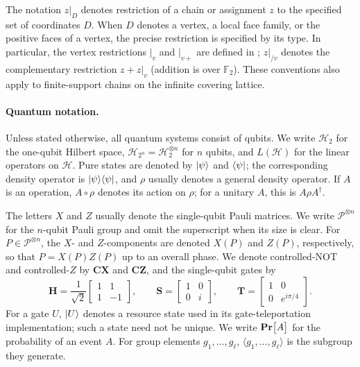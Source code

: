 The notation $z|_D$ denotes restriction of a chain or assignment $z$ to the specified set of coordinates $D$. When $D$ denotes a vertex, a local face family, or the positive faces of a vertex, the precise restriction is specified by its type. In particular, the vertex restrictions $|_v$ and $|_{v+}$ are defined in ; $z|_{/v}$ denotes the complementary restriction $z+z|_v$ (addition is over $\mathbb F_2$). These conventions also apply to finite-support chains on the infinite covering lattice.

\paragraph{Quantum notation.}
Unless stated otherwise, all quantum systems consist of qubits. We write $\mathcal H_2$ for the one-qubit Hilbert space, $\mathcal H_{2^n}=\mathcal H_2^{\otimes n}$ for $n$ qubits, and $L(\mathcal H)$ for the linear operators on $\mathcal H$. Pure states are denoted by $\ket\psi$ and $\bra\psi$; the corresponding density operator is $\ket\psi\!\bra\psi$, and $\rho$ usually denotes a general density operator. If $A$ is an operation, $A\circ\rho$ denotes its action on $\rho$; for a unitary $A$, this is $A\rho A^\dagger$.

The letters $X$ and $Z$ usually denote the single-qubit Pauli matrices. We write $\mathcal P^{\otimes n}$ for the $n$-qubit Pauli group and omit the superscript when its size is clear. For $P\in\mathcal P^{\otimes n}$, the $X$- and $Z$-components are denoted $X(P)$ and $Z(P)$, respectively, so that $P=X(P)Z(P)$ up to an overall phase. We denote controlled-NOT and controlled-$Z$ by $\mathbf{CX}$ and $\mathbf{CZ}$, and the single-qubit gates by
\begin{equation*}
 \mathbf H=\frac{1}{\sqrt 2}\begin{bmatrix}1&1\\1&-1\end{bmatrix},\qquad
 \mathbf S=\begin{bmatrix}1&0\\0&i\end{bmatrix},\qquad
 \mathbf T=\begin{bmatrix}1&0\\0&e^{i\pi/4}\end{bmatrix}.
\end{equation*}
For a gate $U$, $\ket U$ denotes a resource state used in its gate-teleportation implementation; such a state need not be unique. We write $\mathbf{Pr} \big[ A \big]$ for the probability of an event $A$. For group elements $g_1,\ldots,g_\ell$, $\langle g_1,\ldots,g_\ell\rangle$ is the subgroup they generate.

